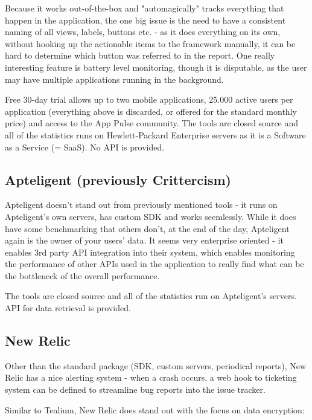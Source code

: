 Because it works out-of-the-box and "automagically" tracks everything that happen in the application, the one big issue is the need to have a consistent naming of all views, labels, buttons etc. - as it does everything on its own, without hooking up the actionable items to the framework manually, it can be hard to determine which button was referred to in the report. One really interesting feature is battery level monitoring, though it is disputable, as the user may have multiple applications running in the background.

Free 30-day trial allows up to two mobile applications, 25.000 active users per application (everything above is discarded, or offered for the standard monthly price) and access to the App Pulse community. The tools are closed source and all of the statistics runs on Hewlett-Packard Enterprise servers as it is a Software as a Service (= SaaS). No API is provided.

\subsection{Apteligent (previously Crittercism)}

Apteligent doesn't stand out from previously mentioned tools - it runs on Apteligent's own servers, has custom SDK and works seemlessly. While it does have some benchmarking that others don't, at the end of the day, Apteligent again is the owner of your users' data. It seems very enterprise oriented - it enables 3rd party API integration into their system, which enables monitoring the performance of other APIs used in the application to really find what can be the bottleneck of the overall performance.

The tools are closed source and all of the statistics run on Apteligent's servers. API for data retrieval is provided.

\subsection{New Relic}

Other than the standard package (SDK, custom servers, periodical reports), New Relic has a nice alerting system - when a crash occurs, a web hook to ticketing system can be defined to streamline bug reports into the issue tracker.

Similar to Tealium, New Relic does stand out with the focus on data encryption:

\bigbreak

